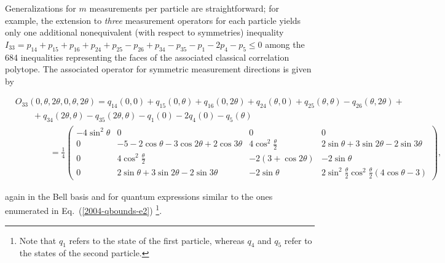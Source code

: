 \documentclass[pra,showpacs,showkeys,amsfonts,amsmath]{revtex4}
\begin{document}
Generalizations for $m$ measurements per particle are
straightforward;
for example, the extension to \emph{three} measurement operators for each particle
yields only one additional nonequivalent (with respect to symmetries)
inequality \cite{collins-gisin-2003,sliwa-2003}
$I_{33}=p_{14} + p_{15} + p_{16} + p_{24} + p_{25} - p_{26} + p_{34} - p_{35}
- p_{1} - 2 p_{4} - p_{5} \leq 0$ among the 684 inequalities \cite{2000-poly} representing the
 faces of the associated classical correlation polytope.
The associated operator for symmetric
measurement directions is given by
\begin{widetext}
\begin{equation}
\begin{array}{lll}
&O_{33}(0,\theta,2\theta,0,\theta,2\theta)= q_{14}(0,0) + q_{15}(0,\theta) + q_{16}(0,2\theta) + q_{24}(\theta,0) +
q_{25}(\theta,\theta) - q_{26}(\theta,2\theta) +\\
&\qquad  + q_{34}(2\theta,\theta)- q_{35}(2\theta,\theta)-q_{1}(0) - 2 q_{4}(0) - q_{5}(\theta) \\
&\qquad \qquad =\frac{1}{4}\left(
\begin{smallmatrix}
-4\sin^2\theta & 0 & 0 & 0\\
0 & -5-2\cos\theta - 3\cos 2\theta + 2\cos 3\theta &
4\cos^2\frac{\theta}{2} & 2\sin\theta + 3 \sin 2\theta - 2 \sin
3\theta\\
0 & 4\cos^2\frac{\theta}{2} & -2(3+\cos 2\theta) & - 2\sin\theta \\
0 &  2\sin\theta + 3 \sin 2\theta - 2 \sin 3\theta & - 2\sin\theta &
2\sin^2\frac{\theta}{2}\cos^2\frac{\theta}{2}(4\cos\theta -3)
\end{smallmatrix}\right),
\end{array}
\label{2004-qbounds-e5}
\end{equation}
\end{widetext}
again in the Bell basis and for quantum expressions similar to the ones enumerated in Eq.~(\ref{2004-qbounds-e2})
\footnote{Note that  $q_{1}$ refers to the state of the first particle,
whereas $q_{4}$ and $q_{5}$ refer to the states of the second
particle.}.
\end{document}
